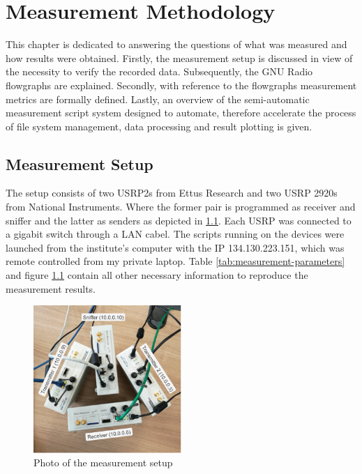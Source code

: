 \chapter{Measurement Methodology}

This chapter is dedicated to answering the questions of what was measured and how results were obtained. Firstly, the measurement setup is discussed in view of the necessity to verify the recorded data. Subsequently,  the GNU Radio flowgraphs are explained. Secondly, with reference to the flowgraphs measurement metrics are formally defined.  Lastly, an overview of the semi-automatic measurement script system designed to automate, therefore accelerate the process of file system management, data processing and result plotting is given.

\section{Measurement Setup}

The setup consists of two USRP2s from Ettus Research and two USRP 2920s from National Instruments. Where the former pair is programmed as receiver and sniffer and the latter  as senders as depicted in \ref{fig:measurement-setup}. Each USRP was connected to a gigabit switch through a LAN cabel. The scripts running on the devices were launched from the institute's computer with the IP 134.130.223.151, which was remote controlled from my private laptop. Table \ref{tab:measurement-parameters} and figure \ref{fig:measurement-setup}  contain all other necessary information to reproduce the measurement results.

\begin{figure}[tb]
	\label{fig:measurement-setup}
	\begin{center}
		\includegraphics[width=0.5\textwidth]{pictures/measurement_setup}
	\end{center}
	\caption{Photo of the measurement setup}
\end{figure}


